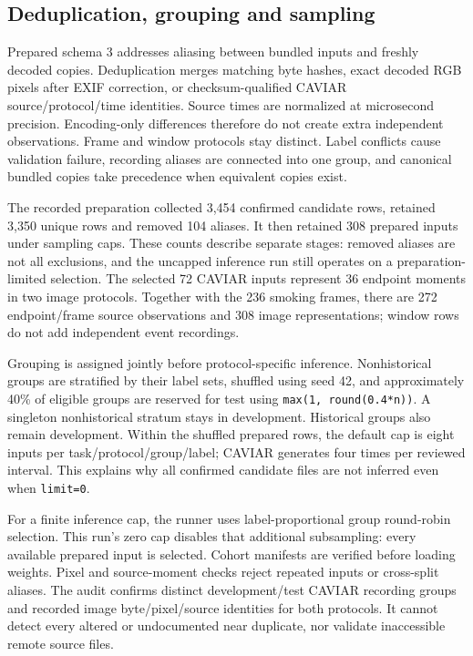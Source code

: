 \documentclass[11pt,a4paper]{article}
\newcommand{\code}[1]{\nolinkurl{#1}}
\begin{document}
\subsection{Deduplication, grouping and sampling}
Prepared schema 3 addresses aliasing between bundled inputs and freshly decoded copies. Deduplication merges matching byte hashes, exact decoded RGB pixels after EXIF correction, or checksum-qualified CAVIAR source/protocol/time identities. Source times are normalized at microsecond precision. Encoding-only differences therefore do not create extra independent observations. Frame and window protocols stay distinct. Label conflicts cause validation failure, recording aliases are connected into one group, and canonical bundled copies take precedence when equivalent copies exist.

The recorded preparation collected 3,454 confirmed candidate rows, retained 3,350 unique rows and removed 104 aliases. It then retained 308 prepared inputs under sampling caps. These counts describe separate stages: removed aliases are not all exclusions, and the uncapped inference run still operates on a preparation-limited selection. The selected 72 CAVIAR inputs represent 36 endpoint moments in two image protocols. Together with the 236 smoking frames, there are 272 endpoint/frame source observations and 308 image representations; window rows do not add independent event recordings.

Grouping is assigned jointly before protocol-specific inference. Nonhistorical groups are stratified by their label sets, shuffled using seed 42, and approximately 40\% of eligible groups are reserved for test using \code{max(1, round(0.4*n))}. A singleton nonhistorical stratum stays in development. Historical groups also remain development. Within the shuffled prepared rows, the default cap is eight inputs per task/protocol/group/label; CAVIAR generates four times per reviewed interval. This explains why all confirmed candidate files are not inferred even when \code{limit=0}.

For a finite inference cap, the runner uses label-proportional group round-robin selection. This run's zero cap disables that additional subsampling: every available prepared input is selected. Cohort manifests are verified before loading weights. Pixel and source-moment checks reject repeated inputs or cross-split aliases. The audit confirms distinct development/test CAVIAR recording groups and recorded image byte/pixel/source identities for both protocols. It cannot detect every altered or undocumented near duplicate, nor validate inaccessible remote source files.
\end{document}
